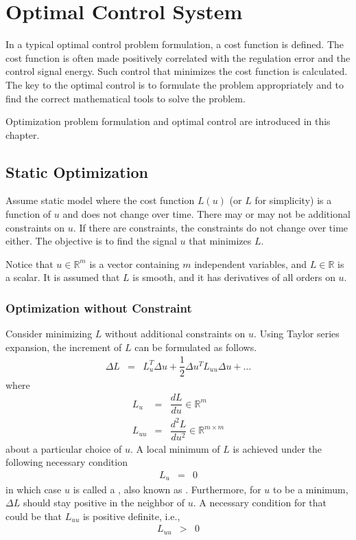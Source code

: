 \chapter{Optimal Control System} \label{ch:optimalrobustcs}

In a typical optimal control problem formulation, a cost function is defined. The cost function is often made positively correlated with the regulation error and the control signal energy. Such control that minimizes the cost function is calculated. The key to the optimal control is to formulate the problem appropriately and to find the correct mathematical tools to solve the problem. 

Optimization problem formulation and optimal control are introduced in this chapter.

\section{Static Optimization} \label{sec:optimalrobustcs:static}

Assume static model where the cost function $L(u)$ (or $L$ for simplicity) is a function of $u$ and does not change over time. There may or may not be additional constraints on $u$. If there are constraints, the constraints do not change over time either. The objective is to find the signal $u$ that minimizes $L$. 

Notice that $u\in\mathbb{R}^m$ is a vector containing $m$ independent variables, and $L\in\mathbb{R}$ is a scalar. It is assumed that $L$ is smooth, and it has derivatives of all orders on $u$.

\subsection{Optimization without Constraint}

Consider minimizing $L$ without additional constraints on $u$. Using Taylor series expansion, the increment of $L$ can be formulated as follows.
\begin{eqnarray}
	\Delta L &=& L_u^T\Delta u + \dfrac{1}{2}\Delta u^TL_{uu}\Delta u + \ldots \nonumber
\end{eqnarray}
where
\begin{eqnarray}
	L_u &=& \dfrac{d L}{d u} \in \mathbb{R}^m \label{eq:lu} \\
	L_{uu} &=& \dfrac{d^2 L}{d u^2} \in \mathbb{R}^{m\times m} \nonumber
\end{eqnarray}
about a particular choice of $u$. A local minimum of $L$ is achieved under the following necessary condition
\begin{eqnarray}
	L_u &=& 0 \nonumber
\end{eqnarray}
in which case $u$ is called a , also known as . Furthermore, for $u$ to be a minimum, $\Delta L$ should stay positive in the neighbor of $u$. A necessary condition for that could be that $L_{uu}$ is positive definite, i.e.,
\begin{eqnarray}
	L_{uu} &>& 0 \nonumber
\end{eqnarray}


